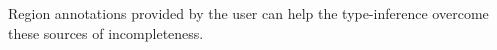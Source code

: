 \begin{enumerate}



\end{enumerate}

Region annotations provided by the user can help the type-inference overcome these
sources of incompleteness.

